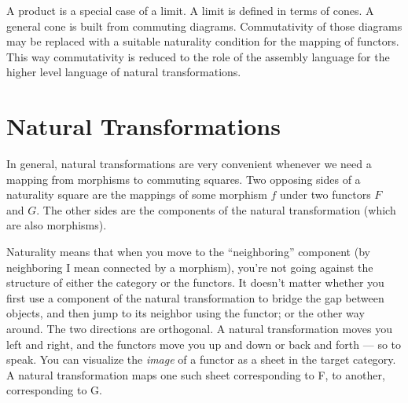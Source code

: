 \noindent
A product is a special case of a limit. A limit is defined in terms of
cones. A general cone is built from commuting diagrams. Commutativity of
those diagrams may be replaced with a suitable naturality condition for
the mapping of functors. This way commutativity is reduced to the role
of the assembly language for the higher level language of natural
transformations.

\section{Natural Transformations}

In general, natural transformations are very convenient whenever we need
a mapping from morphisms to commuting squares. Two opposing sides of a
naturality square are the mappings of some morphism $f$ under two
functors $F$ and $G$. The other sides are the components
of the natural transformation (which are also morphisms).

\begin{figure}[H]
\centering
{}
\end{figure}

\noindent
Naturality means that when you move to the ``neighboring'' component (by
neighboring I mean connected by a morphism), you're not going against
the structure of either the category or the functors. It doesn't matter
whether you first use a component of the natural transformation to
bridge the gap between objects, and then jump to its neighbor using the
functor; or the other way around. The two directions are orthogonal. A
natural transformation moves you left and right, and the functors move
you up and down or back and forth --- so to speak. You can visualize the
\emph{image} of a functor as a sheet in the target category. A natural
transformation maps one such sheet corresponding to F, to another,
corresponding to G.

